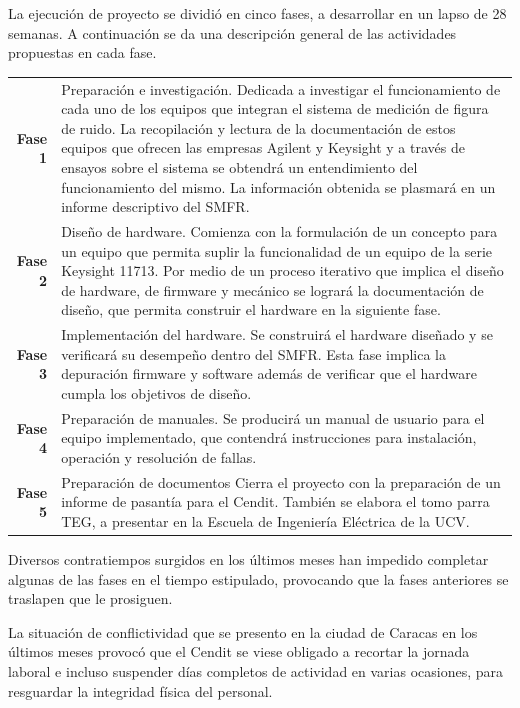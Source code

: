 \documentclass[paper=letter,oneside,fontsize=12pt, parskip=full]{article}
\begin{document}
	La ejecución de proyecto se dividió en cinco fases, a desarrollar en un lapso de 28 semanas. A continuación se da una descripción general de las actividades propuestas en cada fase.

	\begin{table}[!h]
		\begin{tabular}{rp{13cm}}
			\textbf{Fase 1} & Preparación e investigación. Dedicada a investigar el funcionamiento de cada uno de los equipos que integran el sistema de medición de figura de ruido. La recopilación y lectura de la documentación de estos equipos que ofrecen las empresas Agilent y Keysight y a través de ensayos sobre el sistema se obtendrá un entendimiento del funcionamiento del mismo. La información obtenida se plasmará en un informe descriptivo del SMFR. \\			
			\textbf{Fase 2} & Diseño de hardware. Comienza con la formulación de un concepto para un equipo que permita suplir la funcionalidad de un equipo de la serie Keysight 11713. Por medio de un proceso iterativo que implica el diseño de hardware, de firmware y mecánico se logrará la documentación de diseño, que permita construir el hardware en la siguiente fase.	\\		
			\textbf{Fase 3} & Implementación del hardware. Se construirá el hardware diseñado y se verificará su desempeño dentro del SMFR. Esta fase implica la depuración firmware y software además de verificar que el hardware cumpla los objetivos de diseño. \\
			\textbf{Fase 4} & Preparación de manuales. Se producirá un manual de usuario para el equipo implementado, que contendrá instrucciones para instalación, operación y resolución de fallas. \\
			\textbf{Fase 5} & Preparación de documentos Cierra el proyecto con la preparación de un informe de pasantía para el Cendit. También se elabora el tomo parra TEG, a presentar en la Escuela de Ingeniería Eléctrica de la UCV.
		\end{tabular}
	\end{table}

	Diversos contratiempos surgidos en los últimos meses han impedido completar algunas de las fases en el tiempo estipulado, provocando que la fases anteriores se traslapen que le prosiguen.
	
	La situación de conflictividad que se presento en la ciudad de Caracas en los últimos meses provocó que el Cendit se viese obligado a recortar la jornada laboral e incluso suspender días completos de actividad en varias ocasiones, para resguardar la integridad física del personal.
	
\end{document}
